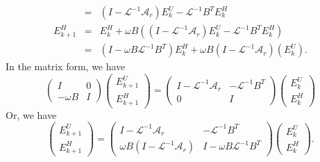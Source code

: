 \begin{itemize}
\begin{eqnarray}
          &=& (I - \mathcal{L}^{-1} \mathcal{A}_r) E^U_k - \mathcal{L}^{-1} B^T E_k^H \\ 
E^H_{k+1} &=& E^H_k + \omega B ((I - \mathcal{L}^{-1} \mathcal{A}_r) E^U_k - \mathcal{L}^{-1} B^T E_k^H ) \\
&=& (I - \omega B \mathcal{L}^{-1} B^T) E_k^H + \omega B (I - \mathcal{L}^{-1} \mathcal{A}_r)(E_k^U). 
\end{eqnarray} 
In the matrix form, we have 
\begin{equation}
\begin{pmatrix} 
I  & 0 \\
-\omega B & I
\end{pmatrix} 
\begin{pmatrix} 
E^U_{k+1} \\
E^H_{k+1}
\end{pmatrix}  = 
\begin{pmatrix} 
I - \mathcal{L}^{-1} \mathcal{A}_r & - \mathcal{L}^{-1} B^T \\
0 & I
\end{pmatrix} 
\begin{pmatrix} 
E^U_{k} \\
E^H_{k}
\end{pmatrix} 
\end{equation}
Or, we have 
\begin{equation}
\begin{pmatrix} 
E^U_{k+1} \\
E^H_{k+1}
\end{pmatrix}  = 
\begin{pmatrix} 
I - \mathcal{L}^{-1} \mathcal{A}_r & - \mathcal{L}^{-1} B^T \\
\omega B (I - \mathcal{L}^{-1} \mathcal{A}_r) & I - \omega B \mathcal{L}^{-1} B^T
\end{pmatrix} 
\begin{pmatrix} 
E^U_{k} \\
E^H_{k}
\end{pmatrix}.  
\end{equation}


\end{itemize}
